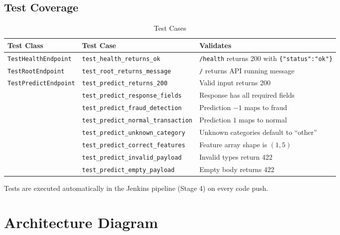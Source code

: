 \documentclass[12pt,a4paper]{article}
\begin{document}
\subsection{Test Coverage}

\begin{table}[H]
\centering
\caption{Test Cases}
\begin{tabular}{@{}llp{6.5cm}@{}}
\toprule
\textbf{Test Class} & \textbf{Test Case} & \textbf{Validates} \\
\midrule
\texttt{TestHealthEndpoint} & \texttt{test\_health\_returns\_ok} & \texttt{/health} returns 200 with \texttt{\{"status":"ok"\}} \\
\midrule
\texttt{TestRootEndpoint} & \texttt{test\_root\_returns\_message} & \texttt{/} returns API running message \\
\midrule
\texttt{TestPredictEndpoint} & \texttt{test\_predict\_returns\_200} & Valid input returns 200 \\
 & \texttt{test\_predict\_response\_fields} & Response has all required fields \\
 & \texttt{test\_predict\_fraud\_detection} & Prediction $-1$ maps to fraud \\
 & \texttt{test\_predict\_normal\_transaction} & Prediction $1$ maps to normal \\
 & \texttt{test\_predict\_unknown\_category} & Unknown categories default to ``other'' \\
 & \texttt{test\_predict\_correct\_features} & Feature array shape is $(1, 5)$ \\
 & \texttt{test\_predict\_invalid\_payload} & Invalid types return 422 \\
 & \texttt{test\_predict\_empty\_payload} & Empty body returns 422 \\
\bottomrule
\end{tabular}
\end{table}

Tests are executed automatically in the Jenkins pipeline (Stage 4) on every code push.

\section{Architecture Diagram}
\end{document}

